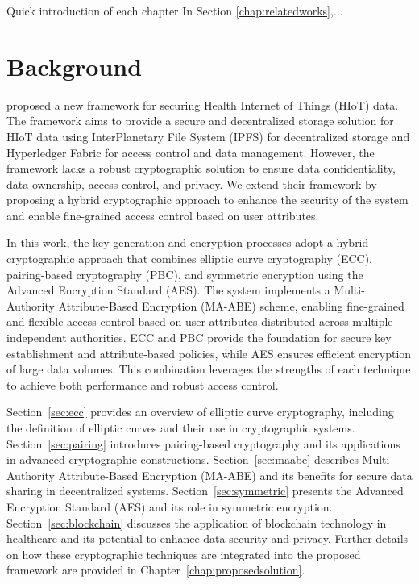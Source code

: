 \documentclass[cic,tc,english]{iiufrgs}
\begin{document}
    \begin{draft}{Quick introduction of each chapter}
        In Section \ref{chap:relatedworks},...

    \end{draft}

\chapter{Background}
    \label{chap:background}

    \citet{laura2023} proposed a new framework for securing Health Internet of Things (HIoT) data. The framework aims to provide a secure and decentralized storage solution for HIoT data using InterPlanetary File System (IPFS) \cite{benet2013ipfs} for decentralized storage and Hyperledger Fabric \cite{fabric} for access control and data management. However, the framework lacks a robust cryptographic solution to ensure data confidentiality, data ownership, access control, and privacy. We extend their framework by proposing a hybrid cryptographic approach to enhance the security of the system and enable fine-grained access control based on user attributes.

    In this work, the key generation and encryption processes adopt a hybrid cryptographic approach that combines elliptic curve cryptography (ECC), pairing-based cryptography (PBC), and symmetric encryption using the Advanced Encryption Standard (AES). The system implements a Multi-Authority Attribute-Based Encryption (MA-ABE) scheme, enabling fine-grained and flexible access control based on user attributes distributed across multiple independent authorities. ECC and PBC provide the foundation for secure key establishment and attribute-based policies, while AES ensures efficient encryption of large data volumes. This combination leverages the strengths of each technique to achieve both performance and robust access control.



    Section~\ref{sec:ecc} provides an overview of elliptic curve cryptography, including the definition of elliptic curves and their use in cryptographic systems. Section~\ref{sec:pairing} introduces pairing-based cryptography and its applications in advanced cryptographic constructions. Section~\ref{sec:maabe} describes Multi-Authority Attribute-Based Encryption (MA-ABE) and its benefits for secure data sharing in decentralized systems. Section~\ref{sec:symmetric} presents the Advanced Encryption Standard (AES) and its role in symmetric encryption. Section~\ref{sec:blockchain} discusses the application of blockchain technology in healthcare and its potential to enhance data security and privacy. Further details on how these cryptographic techniques are integrated into the proposed framework are provided in Chapter~\ref{chap:proposedsolution}.
    
\end{document}

